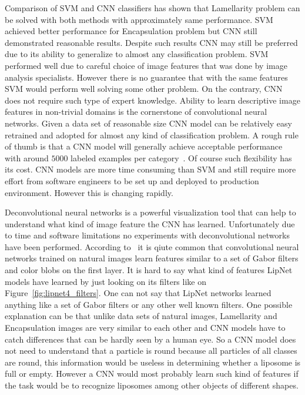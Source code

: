 \documentclass[a4paper, 11pt, table]{article}
\begin{document}
Comparison of SVM and CNN classifiers has shown that Lamellarity problem can be solved with both methods with approximately same performance. SVM achieved better performance for Encapsulation problem but CNN still demonstrated reasonable results. Despite such results CNN may still be preferred due to its ability to generalize to almost any classification problem. SVM performed well due to careful choice of image features that was done by image analysis specialists. However there is no guarantee that with the same features SVM would perform well solving some other problem. On the contrary, CNN does not require such type of expert knowledge. Ability to learn descriptive image features in non-trivial domains is the cornerstone of convolutional neural networks. Given a data set of reasonable size CNN model can be relatively easy retrained and adopted for almost any kind of classification problem. A rough rule of thumb is that a CNN model will generally achieve acceptable performance with around $5000$ labeled examples per category~\cite{dl_book}. Of course such flexibility has its cost. CNN models are more time consuming than SVM and still require more effort from software engineers to be set up and deployed to production environment. However this is changing rapidly. 

Deconvolutional neural networks is a powerful visualization tool that can help to understand what kind of image feature the CNN has learned. Unfortunately due to time and software limitations no experiments with deconvolutional networks have been performed. According to~\cite{DBLP:journals/corr/YosinskiCBL14} it is qiute common that convolutional neural networks trained on natural images learn features similar to a set of Gabor filters and color blobs on the first layer. It is hard to say what kind of features LipNet models have learned by just looking on its filters like on Figure~\ref{fig:lipnet4_filters}. One can not say that LipNet networks learned anything like a set of Gabor filters or any other well known filters. One possible explanation can be that unlike data sets of natural images, Lamellarity and Encapsulation images are very similar to each other and CNN models have to catch differences that can be hardly seen by a human eye. So a CNN model does not need to understand that a particle is round because all particles of all classes are round, this information would be useless in determining whether a liposome is full or empty. However a CNN would most probably learn such kind of features if the task would be to recognize liposomes among other objects of different shapes. 
\end{document}
